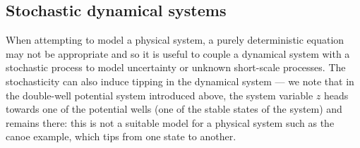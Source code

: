 \subsection{Stochastic dynamical systems}
\label{subsec:intro:dynamicalsystems:stochastic}

When attempting to model a physical system, a purely deterministic equation may not be appropriate \citep{shumway2017time} and so it is useful to couple a dynamical system with a stochastic process to model uncertainty or unknown short-scale processes. The stochasticity can also induce tipping in the dynamical system — we note that in the double-well potential system introduced above, the system variable $z$ heads towards one of the potential wells (one of the stable states of the system) and remains there: this is not a suitable model for a physical system such as the canoe example, which tips from one state to another.

